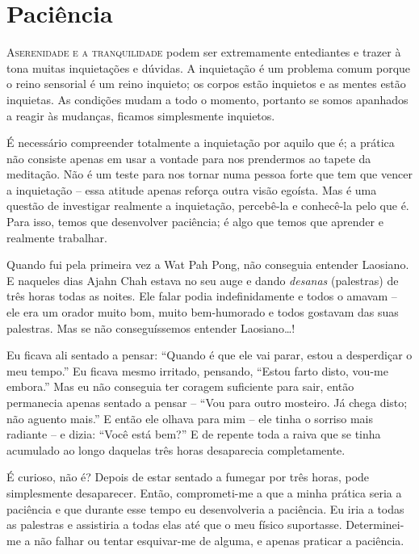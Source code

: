 \chapter{Paciência}

\lettrine{A}{\space serenidade e a tranquilidade} podem ser extremamente entediantes e trazer à
tona muitas inquietações e dúvidas. A inquietação é um problema comum porque o
reino sensorial é um reino inquieto; os corpos estão inquietos e as mentes estão
inquietas. As condições mudam a todo o momento, portanto se somos apanhados a
reagir às mudanças, ficamos simplesmente inquietos.

É necessário compreender totalmente a inquietação por aquilo que é; a prática
não consiste apenas em usar a vontade para nos prendermos ao tapete da
meditação. Não é um teste para nos tornar numa pessoa forte que tem que vencer a
inquietação -- essa atitude apenas reforça outra visão egoísta. Mas é uma
questão de investigar realmente a inquietação, percebê-la e conhecê-la pelo que
é. Para isso, temos que desenvolver paciência; é algo que temos que aprender e
realmente trabalhar.

Quando fui pela primeira vez a Wat Pah Pong, não conseguia entender Laosiano. E
naqueles dias Ajahn Chah estava no seu auge e dando \emph{desanas} (palestras)
de três horas todas as noites. Ele falar podia indefinidamente e todos o amavam
-- ele era um orador muito bom, muito bem-humorado e todos gostavam das suas
palestras. Mas se não conseguíssemos entender Laosiano\ldots{}!

Eu ficava ali sentado a pensar: ``Quando é que ele vai parar, estou a
desperdiçar o meu tempo.'' Eu ficava mesmo irritado, pensando, ``Estou farto
disto, vou-me embora.'' Mas eu não conseguia ter coragem suficiente para sair,
então permanecia apenas sentado a pensar -- ``Vou para outro mosteiro. Já chega
disto; não aguento mais.'' E então ele olhava para mim -- ele tinha o sorriso
mais radiante -- e dizia: ``Você está bem?'' E de repente toda a raiva que se
tinha acumulado ao longo daquelas três horas desaparecia completamente.

É curioso, não é? Depois de estar sentado a fumegar por três horas, pode
simplesmente desaparecer. Então, comprometi-me a que a minha prática seria a
paciência e que durante esse tempo eu desenvolveria a paciência. Eu iria a todas
as palestras e assistiria a todas elas até que o meu físico suportasse.
Determinei-me a não falhar ou tentar esquivar-me de alguma, e apenas praticar a
paciência.

